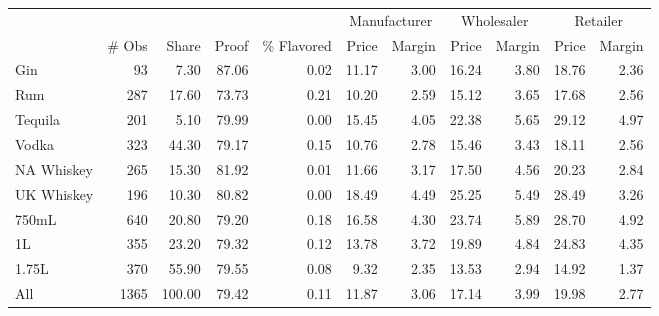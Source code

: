 \begin{tabular}{lrrrrrrrrrr}
\toprule
 &&&&& \multicolumn{2}{c}{ Manufacturer } & \multicolumn{2}{c}{ Wholesaler }& \multicolumn{2}{c}{ Retailer } \\ 
 & \# Obs & Share & Proof & \% Flavored & Price & Margin & Price & Margin & Price & Margin \\
\midrule
Gin & 93 & 7.30 & 87.06 & 0.02 & 11.17 & 3.00 & 16.24 & 3.80 & 18.76 & 2.36 \\
Rum & 287 & 17.60 & 73.73 & 0.21 & 10.20 & 2.59 & 15.12 & 3.65 & 17.68 & 2.56 \\
Tequila & 201 & 5.10 & 79.99 & 0.00 & 15.45 & 4.05 & 22.38 & 5.65 & 29.12 & 4.97 \\
Vodka & 323 & 44.30 & 79.17 & 0.15 & 10.76 & 2.78 & 15.46 & 3.43 & 18.11 & 2.56 \\
NA Whiskey & 265 & 15.30 & 81.92 & 0.01 & 11.66 & 3.17 & 17.50 & 4.56 & 20.23 & 2.84 \\
UK Whiskey & 196 & 10.30 & 80.82 & 0.00 & 18.49 & 4.49 & 25.25 & 5.49 & 28.49 & 3.26 \\
\midrule
750mL & 640 & 20.80 & 79.20 & 0.18 & 16.58 & 4.30 & 23.74 & 5.89 & 28.70 & 4.92 \\
1L & 355 & 23.20 & 79.32 & 0.12 & 13.78 & 3.72 & 19.89 & 4.84 & 24.83 & 4.35 \\
1.75L & 370 & 55.90 & 79.55 & 0.08 & 9.32 & 2.35 & 13.53 & 2.94 & 14.92 & 1.37 \\
\midrule
All & 1365 & 100.00 & 79.42 & 0.11 & 11.87 & 3.06 & 17.14 & 3.99 & 19.98 & 2.77 \\
\bottomrule
\end{tabular}
